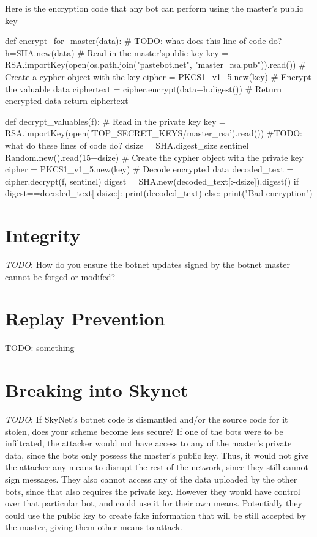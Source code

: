 \documentclass[9pt,a4paper]{article}
\begin{document}
Here is the encryption code that any bot can perform using the master's public key
\begin{center}
\vspace{-2ex}
\begin{python}
def encrypt_for_master(data):
    # TODO: what does this line of code do?
    h=SHA.new(data)
    # Read in the master'spublic key
    key = RSA.importKey(open(os.path.join("pastebot.net", "master_rsa.pub")).read())
    # Create a cypher object with the key
    cipher = PKCS1_v1_5.new(key)
    # Encrypt the valuable data
    ciphertext = cipher.encrypt(data+h.digest())
    # Return encrypted data
    return ciphertext
\end{python}
\end{center}

\begin{center}
\vspace{-2ex}
\begin{python}
def decrypt_valuables(f):
    # Read in the private key
    key = RSA.importKey(open('TOP_SECRET_KEYS/master_rsa').read())
    #TODO: what do these lines of code do?
    dsize = SHA.digest_size
    sentinel = Random.new().read(15+dsize)
    # Create the cypher object with the private key
    cipher = PKCS1_v1_5.new(key)
    # Decode encrypted data
    decoded_text = cipher.decrypt(f, sentinel)
    digest = SHA.new(decoded_text[:-dsize]).digest()
    if digest==decoded_text[-dsize:]:
        print(decoded_text)
    else:
        print("Bad encryption")
\end{python}
\end{center}


\section{Integrity}

\emph{TODO}: How do you ensure the botnet updates signed by the botnet master cannot be forged or modifed?

\section{Replay Prevention}
TODO: something

\section{Breaking into Skynet}
\emph{TODO}: If SkyNet's botnet code is dismantled and/or the source code for it stolen, does your scheme become less secure?
If one of the bots were to be infiltrated, the attacker would not have access to any of the master's private data, since the bots only possess the master's public key. Thus, it would not give the attacker any means to disrupt the rest of the network, since they still cannot sign messages. They also cannot access any of the data uploaded by the other bots, since that also requires the private key. However they would have control over that particular bot, and could use it for their own means. Potentially they could use the public key to create fake information that will be still accepted by the master, giving them other means to attack. 
\end{document}
